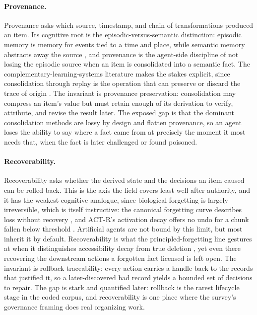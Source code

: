 \paragraph{Provenance.} Provenance asks which source, timestamp, and chain of transformations produced an item. Its cognitive root is the episodic-versus-semantic distinction: episodic memory is memory for events tied to a time and place, while semantic memory abstracts away the source \citep{tulving1972episodic}, and provenance is the agent-side discipline of not losing the episodic source when an item is consolidated into a semantic fact. The complementary-learning-systems literature makes the stakes explicit, since consolidation through replay is the operation that can preserve or discard the trace of origin \citep{mcclelland1995complementary,wilson1994reactivation}. The invariant is provenance preservation: consolidation may compress an item's value but must retain enough of its derivation to verify, attribute, and revise the result later. The exposed gap is that the dominant consolidation methods are lossy by design and flatten provenance, so an agent loses the ability to say where a fact came from at precisely the moment it most needs that, when the fact is later challenged or found poisoned.

\paragraph{Recoverability.} Recoverability asks whether the derived state and the decisions an item caused can be rolled back. This is the axis the field covers least well after authority, and it has the weakest cognitive analogue, since biological forgetting is largely irreversible, which is itself instructive: the canonical forgetting curve describes loss without recovery \citep{murre2015replication}, and ACT-R's activation decay offers no undo for a chunk fallen below threshold \citep{anderson2004actr}. Artificial agents are not bound by this limit, but most inherit it by default. Recoverability is what the principled-forgetting line gestures at when it distinguishes accessibility decay from true deletion \citep{uddin2026recallforgettingbenchmarkinglongterm}, yet even there recovering the downstream actions a forgotten fact licensed is left open. The invariant is rollback traceability: every action carries a handle back to the records that justified it, so a later-discovered bad record yields a bounded set of decisions to repair. The gap is stark and quantified later: rollback is the rarest lifecycle stage in the coded corpus, and recoverability is one place where the survey's governance framing does real organizing work.

